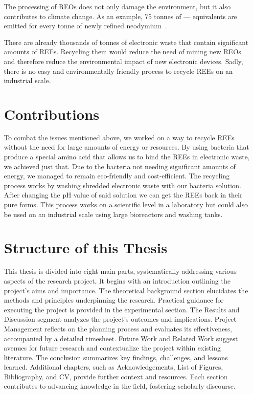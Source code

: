 The processing of REOs does not only damage the environment, but it also contributes to climate change.
As an example, 75 tonnes of — equivalents are emitted for every tonne of newly refined neodymium~\cite{reeclimate}.

There are already thousands of tonnes of electronic waste that contain significant amounts of REEs. Recycling them would reduce the need of mining new REOs and therefore reduce the environmental impact of new electronic devices.
Sadly, there is no easy and environmentally friendly process to recycle REEs on an industrial scale.


\section{Contributions\authorB{}}
To combat the issues mentioned above, we worked on a way to recycle REEs without the
need for large amounts of energy or resources.
By using bacteria that produce a special amino acid that allows us to bind the REEs in electronic waste, we achieved just that.
Due to the bacteria not needing significant amounts of energy, we managed to remain eco-friendly and cost-efficient.
The recycling process works by washing shredded electronic waste with our bacteria solution.
After changing the pH value of said solution we can get
the REEs back in their pure forms.
This process works on a scientific level in a laboratory but could also be used on an industrial scale using large bioreactors and washing tanks.


\section{Structure of this Thesis\authorB{}}
This thesis is divided into eight main parts, systematically addressing various aspects of
the research project. It begins with an introduction outlining the project's aims and
importance. The theoretical background section elucidates the methods and principles
underpinning the research. Practical guidance for executing the project is provided in the
experimental section. The Results and Discussion segment analyzes the project's
outcomes and implications. Project Management reflects on the planning process and
evaluates its effectiveness, accompanied by a detailed timesheet. Future Work and
Related Work suggest avenues for future research and contextualize the project within
existing literature. The conclusion summarizes key findings, challenges, and lessons
learned. Additional chapters, such as Acknowledgements, List of Figures, Bibliography,
and CV, provide further context and resources. Each section contributes to advancing
knowledge in the field, fostering scholarly discourse.

